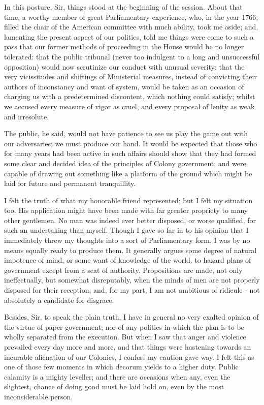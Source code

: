 In this posture, Sir, things stood at the beginning of the session. About that time, a worthy member of great Parliamentary experience, who, in the year 1766, filled the chair of the American committee with much ability, took me aside; and, lamenting the present aspect of our politics, told me things were come to such a pass that our former methods of proceeding in the House would be no longer tolerated: that the public tribunal (never too indulgent to a long and unsuccessful opposition) would now scrutinize our conduct with unusual severity: that the very vicissitudes and shiftings of Ministerial measures, instead of convicting their authors of inconstancy and want of system, would be taken as an occasion of charging us with a predetermined discontent, which nothing could satisfy; whilst we accused every measure of vigor as cruel, and every proposal of lenity as weak and irresolute.\par

The public, he said, would not have patience to see us play the game out with our adversaries; we must produce our hand. It would be expected that those who for many years had been active in such affairs should show that they had formed some clear and decided idea of the principles of Colony government; and were capable of drawing out something like a platform of the ground which might be laid for future and permanent tranquillity.\par

I felt the truth of what my honorable friend represented; but I felt my situation too. His application might have been made with far greater propriety to many other gentlemen. No man was indeed ever better disposed, or worse qualified, for such an undertaking than myself. Though I gave so far in to his opinion that I immediately threw my thoughts into a sort of Parliamentary form, I was by no means equally ready to produce them. It generally argues some degree of natural impotence of mind, or some want of knowledge of the world, to hazard plans of government except from a seat of authority. Propositions are made, not only ineffectually, but somewhat disreputably, when the minds of men are not properly disposed for their reception; and, for my part, I am not ambitious of ridicule - not absolutely a candidate for disgrace.\par

Besides, Sir, to speak the plain truth, I have in general no very exalted opinion of the virtue of paper government; nor of any politics in which the plan is to be wholly separated from the execution. But when I saw that anger and violence prevailed every day more and more, and that things were hastening towards an incurable alienation of our Colonies, I confess my caution gave way. I felt this as one of those few moments in which decorum yields to a higher duty. Public calamity is a mighty leveller; and there are occasions when any, even the slightest, chance of doing good must be laid hold on, even by the most inconsiderable person.\par

